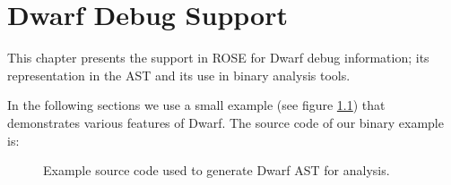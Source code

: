 \chapter{Dwarf Debug Support}

This chapter presents the support in ROSE for Dwarf debug information; its 
representation in the AST and its use in binary analysis tools.

In the following sections we use a small example (see figure \ref{Tutorial:dwarfAnalysisExampleSourceCode}) 
that demonstrates various features of Dwarf. The source code of our binary example is:


\begin{figure}[!h]
{\indent
{\mySmallFontSize

\begin{latexonly}
   
\end{latexonly}

\begin{htmlonly}
   
\end{htmlonly}

}
}
\caption{Example source code used to generate Dwarf AST for analysis.}
\label{Tutorial:dwarfAnalysisExampleSourceCode}
\end{figure}


